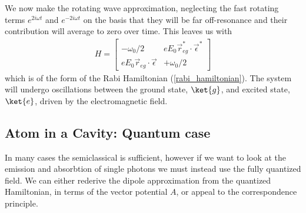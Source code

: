 We now make the rotating wave approximation, neglecting the fast rotating terms $e^{2i\omega t}$ and $e^{-2i\omega t}$ on the basis that they will be far off-resonance and their contribution will average to zero over time. This leaves us with 
\begin{align}
  H =
  \begin{bmatrix}
    -\omega_0/2 & eE_0\vec{r}_{eg}^*\cdot\vec{\epsilon}^* \\
    eE_0\vec{r}_{eg}\cdot\vec{\epsilon} & +\omega_0/2
  \end{bmatrix}
\end{align}
which is of the form of the Rabi Hamiltonian (\ref{rabi_hamiltonian}). The system will undergo oscillations between the ground state, $\ket{g}$, and excited state, $\ket{e}$, driven by the electromagnetic field.

\subsection{Atom in a Cavity: Quantum case}

In many cases the semiclassical is sufficient, however if we want to look at the emission and absorbtion of single photons we must instead use the fully quantized field. We can either rederive the dipole approximation from the quantized Hamiltonian, in terms of the vector potential $A$, or appeal to the correspondence principle. 

